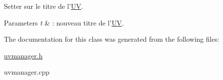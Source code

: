 Setter sur le titre de l'\hyperlink{class_u_v}{U\+V}. 


\begin{DoxyParams}{Parameters}
{\em t} & \+: nouveau titre de l'\hyperlink{class_u_v}{U\+V}. \\
\hline
\end{DoxyParams}


The documentation for this class was generated from the following files\+:\begin{DoxyCompactItemize}
\item 
\hyperlink{uvmanager_8h}{uvmanager.\+h}\item 
uvmanager.\+cpp\end{DoxyCompactItemize}
